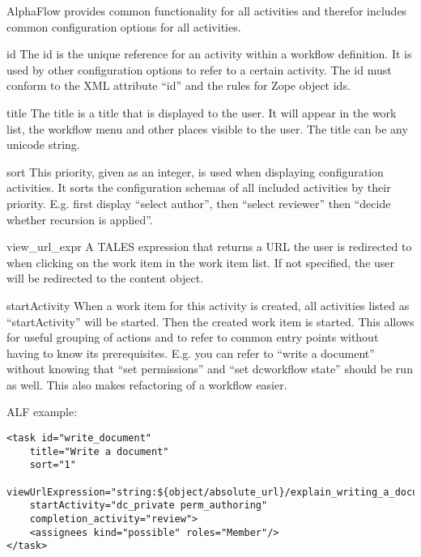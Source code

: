 AlphaFlow provides common functionality for all activities and therefor
includes common configuration options for all activities.

\begin{memberdesc}{id}
    The id is the unique reference for an activity within a workflow definition. It is used by
    other configuration options to refer to a certain activity. The id must conform to the XML attribute ``id'' and
    the rules for Zope object ids.
\end{memberdesc}

\begin{memberdesc}{title}
    The title is a title that is displayed to the user. It will appear in the work list, the workflow menu
    and other places visible to the user. The title can be any unicode string.
\end{memberdesc}

\begin{memberdesc}{sort} This priority, given as an integer, is used when
    displaying configuration activities. It sorts the configuration schemas of
    all included activities by their priority. E.g. first display ``select
    author'', then ``select reviewer'' then ``decide whether recursion is
    applied''.
\end{memberdesc}

\begin{memberdesc}{view\_url\_expr} A TALES expression that returns a URL the
    user is redirected to when clicking on the work item in the work item list.
    If not specified, the user will be redirected to the content object.
\end{memberdesc}

\begin{memberdesc}{startActivity}
    When a work item for this activity is created, all activities listed as ``startActivity'' will be started.
    Then the created work item is started. This allows for useful grouping of actions and to refer to common
    entry points without having to know its prerequisites. E.g. you can refer to ``write a document'' without knowing
    that ``set permissions'' and ``set dcworkflow state'' should be run as well. This also makes refactoring 
    of a workflow easier.
\end{memberdesc}

ALF example:

\begin{verbatim}
<task id="write_document"
    title="Write a document"
    sort="1"
    viewUrlExpression="string:${object/absolute_url}/explain_writing_a_document"
    startActivity="dc_private perm_authoring"
    completion_activity="review">
    <assignees kind="possible" roles="Member"/>
</task>
\end{verbatim}

